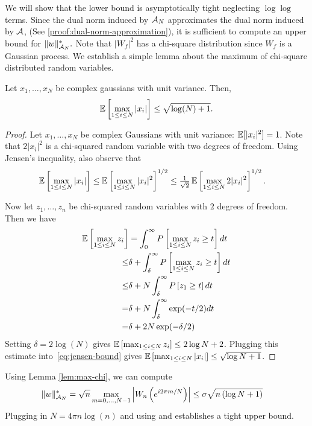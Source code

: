  We will show that the lower bound is asymptotically tight neglecting $\log\log$ terms. Since the dual norm induced by  $\mathcal{A}_N$ approximates the dual norm induced by $\mathcal{A}$, (See \ref{proof:dual-norm-approximation}), it is sufficient to compute an upper bound for $\lVert w\rVert_{\mathcal{A}_N}^*.$ Note that $|W_f|^2$ has a chi-square distribution since $W_f$ is a Gaussian process. We establish a simple lemma about the maximum of chi-square distributed random variables.
\begin{lemma}
\label{lem:max-chi}
Let $x_1,\ldots,x_N$ be complex gaussians with unit variance. Then,
\begin{equation*}
\operatorname{\mathbb{E}}\left[\max_{1\leq i\leq N} |x_i|\right] \leq \sqrt{\log(N) + 1}.
\end{equation*}
\begin{proof}
Let $x_1,\ldots,x_N$ be complex Gaussians with unit variance: $\operatorname{\mathbb{E}}[ |x_i|^2]=1$.  Note that $2|x_i|^2$ is a chi-squared random variable with two degrees of freedom.   Using Jensen's inequality, also observe that
\begin{align}\label{eq:jensen-bound}
	\operatorname{\mathbb{E}}\left[\max_{1\leq i\leq N} |x_i|\right] & \leq  
	\operatorname{\mathbb{E}}\left[\max_{1\leq i\leq N} |x_i|^2\right]^{1/2} \leq  
	\tfrac{1}{\sqrt{2}}\operatorname{\mathbb{E}}\left[\max_{1\leq i\leq N} 2|x_i|^2\right]^{1/2}.
\end{align}

Now let $z_1,\ldots, z_n$ be chi-squared random variables with $2$ degrees of freedom.  Then we have
\begin{align*}
	\operatorname{\mathbb{E}}\left[\max_{1\leq i\leq N} z_i\right] &= \int_0^\infty P\left[ \max_{1\leq i\leq N} z_i \geq t \right] dt\\
	\leq & \delta + \int_\delta^\infty P\left[ \max_{1\leq i\leq N} z_i \geq t \right] dt\\
	\leq & \delta +  N \int_\delta^\infty P\left[  z_1 \geq t\right] dt\\
	= & \delta +  N \int_\delta^\infty   \exp(-t/2) dt\\
	= & \delta +  2N  \exp(-\delta/2)
\end{align*}
Setting $\delta = 2\log(N)$ gives $\operatorname{\mathbb{E}}\left[\max_{1\leq i\leq N} z_i\right] \leq 2 \log{N} + 2$.  Plugging this estimate into~\eqref{eq:jensen-bound} gives $\operatorname{\mathbb{E}}\left[\max_{1\leq i\leq N} |x_i|\right] \leq  \sqrt{\log{N}+1}$.
\end{proof}
\end{lemma}
Using Lemma \ref{lem:max-chi}, we can compute
\begin{align*}
\lVert w\rVert_{\mathcal{A}_N}^* & = \sqrt{n}\max_{m=0,\ldots,N-1} \left| W_n\left(e^{i 2 \pi m/N}\right) \right|  \leq \sigma\sqrt{n\left(\log{N}+1\right)}
\end{align*}
Plugging in $N = 4\pi n \log(n)$ and using  and  establishes a tight upper bound.

